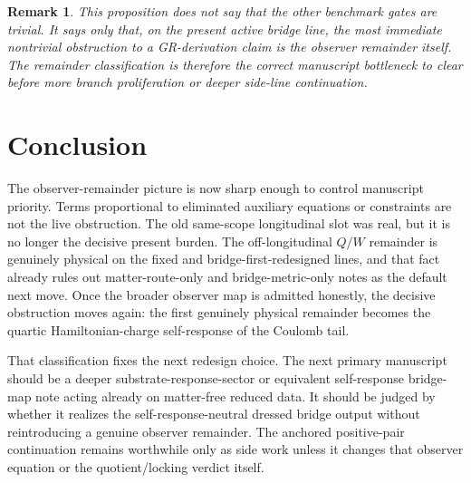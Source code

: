 \documentclass[11pt]{article}
\newtheorem{remark}{Remark}
\begin{document}
\begin{remark}
This proposition does not say that the other benchmark gates are trivial. It says only that, on the present active bridge line, the most immediate nontrivial obstruction to a GR-derivation claim is the observer remainder itself. The remainder classification is therefore the correct manuscript bottleneck to clear before more branch proliferation or deeper side-line continuation.
\end{remark}

\section{Conclusion}

The observer-remainder picture is now sharp enough to control manuscript priority. Terms proportional to eliminated auxiliary equations or constraints are not the live obstruction. The old same-scope longitudinal slot was real, but it is no longer the decisive present burden. The off-longitudinal \(Q/W\) remainder is genuinely physical on the fixed and bridge-first-redesigned lines, and that fact already rules out matter-route-only and bridge-metric-only notes as the default next move. Once the broader observer map is admitted honestly, the decisive obstruction moves again: the first genuinely physical remainder becomes the quartic Hamiltonian-charge self-response of the Coulomb tail.

That classification fixes the next redesign choice. The next primary manuscript should be a deeper substrate-response-sector or equivalent self-response bridge-map note acting already on matter-free reduced data. It should be judged by whether it realizes the self-response-neutral dressed bridge output without reintroducing a genuine observer remainder. The anchored positive-pair continuation remains worthwhile only as side work unless it changes that observer equation or the quotient/locking verdict itself.
\end{document}
